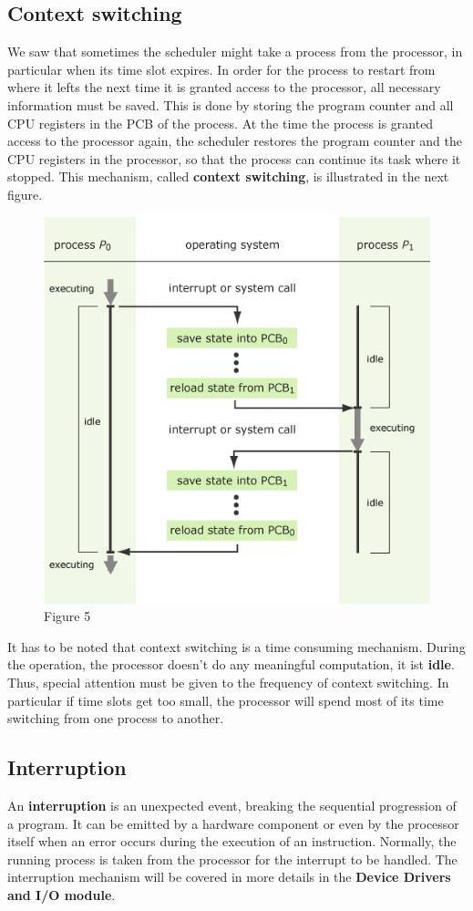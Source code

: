 \documentclass[11pt,a4paper]{scrreprt}
\begin{document}
\subsection{Context switching}
We saw that sometimes the scheduler might take a process from the processor, in particular when its time slot expires. In order for the process to restart from where it lefts the next time it is granted access to the processor, all necessary information must be saved. This is done by storing the program counter and all CPU registers in the PCB of the process. At the time the process is granted access to the processor again, the scheduler restores the program counter and the CPU registers in the processor, so that the process can continue its task where it stopped. This mechanism, called \textbf{context switching}, is illustrated in the next figure.
\begin{figure}[!ht]
\centering
\includegraphics[width=0.6\linewidth]{img/context.png}
\caption{Figure 5}
\label{fig:figure5}
\end{figure}
It has to be noted that context switching is a time consuming mechanism. During the operation, the processor doesn't do any meaningful computation, it ist \textbf{idle}.
Thus, special attention must be given to the frequency of context switching. In particular if time slots get too small, the processor will spend most of its time switching from one process to another.

\subsection{Interruption}
An \textbf{interruption} is an unexpected event, breaking the sequential progression of a program. It can be emitted by a hardware component or even by the processor itself when an error occurs during the execution of an instruction. Normally, the running process is taken from the processor for the interrupt to be handled. The interruption mechanism will be covered in more details in the \textbf{Device Drivers and I/O module}.
\end{document}
